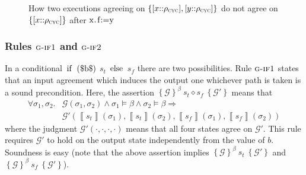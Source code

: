\documentclass[prodmode,acmtocl]{acmsmall}
\def\state{\ensuremath{\sigma}\xspace}
\def\uco{\ensuremath{\rho}\xspace}
\newcommand{\0}{\mbox{\bf 0}}
\newcommand{\CODE}[1]{\ensuremath{\mbox{\lstinline!#1!}\xspace}\xspace}
\newcommand{\SEMANTICS}[1]{\left\llbracket #1 \right\rrbracket}
\def\CYCLEDOM{\ensuremath{\uco_{\textsc{cyc}}}\xspace}
\def\PRED{\beta}
\def\AGREEM{\mathcal{G}}
\newcommand{\AGRS}[2]{[#2{::}#1]}
\newcommand{\GRULENAME}[1]{\textsc{g-#1}}
\newcommand{\TRIPLEB}[4]{\left\{#1\right\}^{#2}\ #3\ \left\{#4\right\}}
\begin{document}
\begin{example}
\begin{figure}
\begin{center}
    \end{center}
    \caption{How two executions agreeing on $\{
      \AGRS{\CYCLEDOM}{x},\AGRS{\CYCLEDOM}{y} \}$ do not agree on $\{
      \AGRS{\CYCLEDOM}{x} \}$ after \CODE{x.f:=y}}
    \label{fig:cyclicity}
  \end{figure}
\end{example}

\subsubsection{Rules $\GRULENAME{if1}$ and $\GRULENAME{if2}$}

In a conditional
\CODE{if ($b$)} $s_t$ \CODE{else} $s_f$
there are two possibilities.  Rule $\GRULENAME{if1}$ states that an
input agreement which induces the output one whichever path is taken
is a sound precondition.  Here, the assertion
$\TRIPLEB{\AGREEM}{\PRED}{s_t \diamond s_f}{\AGREEM'}$ means that
\[
  \begin{array}{rl}
    \forall \state_1,\state_2. & \AGREEM(\state_1,\state_2) \wedge
    \state_1 \models \PRED \wedge \state_2 \models \PRED \Rightarrow \\
    & \AGREEM'(\SEMANTICS{s_t}(\state_1), \SEMANTICS{s_t}(\state_2),
    \SEMANTICS{s_f}(\state_1), \SEMANTICS{s_f}(\state_2))
  \end{array}
\]
\noindent
where the judgment $\AGREEM'(\cdot,\cdot,\cdot,\cdot)$ means that all
four states agree on $\AGREEM'$.  This rule requires $\AGREEM'$ to
hold on the output state independently from the value of $b$.
Soundness is easy (note that the above assertion implies
$\TRIPLEB{\AGREEM}{\PRED}{s_t}{\AGREEM'}$ and
$\TRIPLEB{\AGREEM}{\PRED}{s_f}{\AGREEM'}$).
\end{document}
